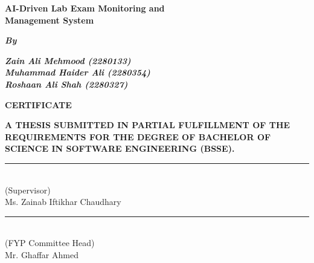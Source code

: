 \singlespacing
\newpage
\thispagestyle{empty}

\begin{center}
\vspace*{0.8cm}

{\bfseries\fontsize{20}{24}\selectfont 
AI-Driven Lab Exam Monitoring and\\
Management System\par}

\vspace{0.8cm}

{\bfseries\itshape\fontsize{16}{18}\selectfont By\par}

\vspace{0.5cm}

{\bfseries\itshape\fontsize{14}{16}\selectfont
Zain Ali Mehmood (2280133)\\
Muhammad Haider Ali (2280354)\\
Roshaan Ali Shah (2280327)\par}

\vspace{0.8cm}

{\bfseries\fontsize{22}{26}\selectfont CERTIFICATE\par}

\end{center}

\vspace{0.6cm}

\begin{center}
{\bfseries\fontsize{11}{14}\selectfont
A THESIS SUBMITTED IN PARTIAL FULFILLMENT OF THE REQUIREMENTS FOR THE DEGREE OF BACHELOR OF SCIENCE IN SOFTWARE ENGINEERING (BSSE).\par}
\end{center}

\vspace{2.5cm}

\noindent
\begin{minipage}{0.48\textwidth}
\centering
\rule{6cm}{0.4pt}\\[4pt]
(Supervisor)\\
Ms. Zainab Iftikhar Chaudhary
\end{minipage}
\hfill
\begin{minipage}{0.48\textwidth}
\centering
\rule{6cm}{0.4pt}\\[4pt]
(FYP Committee Head)\\
Mr. Ghaffar Ahmed
\end{minipage}

